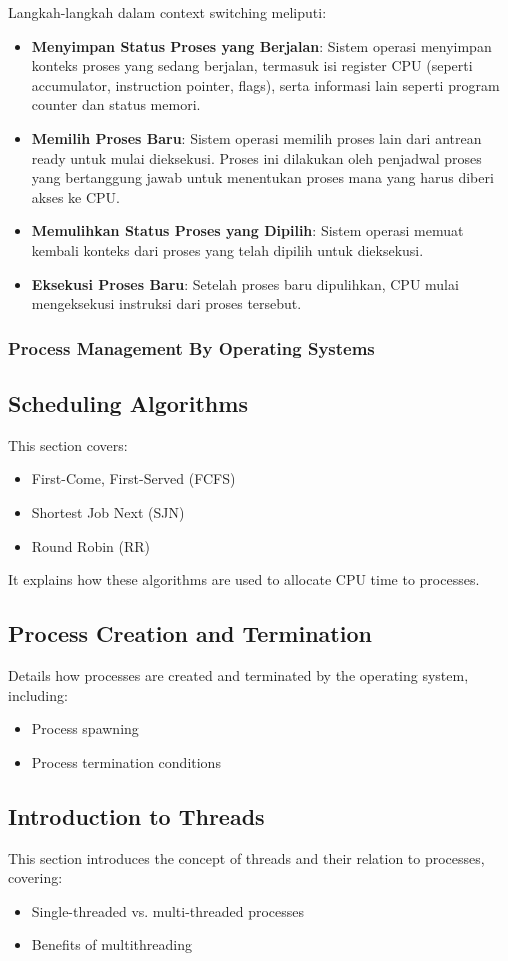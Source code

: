 \documentclass[12pt]{article}
\begin{document}
Langkah-langkah dalam context switching meliputi:
\begin{itemize}
\item \textbf{Menyimpan Status Proses yang Berjalan}:
Sistem operasi menyimpan konteks proses yang sedang berjalan, termasuk isi register CPU (seperti accumulator, instruction pointer, flags), serta informasi lain seperti program counter dan status memori.
\item \textbf{Memilih Proses Baru}:
Sistem operasi memilih proses lain dari antrean ready untuk mulai dieksekusi. Proses ini dilakukan oleh penjadwal proses yang bertanggung jawab untuk menentukan proses mana yang harus diberi akses ke CPU.
\item \textbf{Memulihkan Status Proses yang Dipilih}:
Sistem operasi memuat kembali konteks dari proses yang telah dipilih untuk dieksekusi.
\item \textbf{Eksekusi Proses Baru}:
Setelah proses baru dipulihkan, CPU mulai mengeksekusi instruksi dari proses tersebut.
\end{itemize}

\subsubsection{Process Management By Operating Systems}
\subsection{Scheduling Algorithms}
This section covers:
\begin{itemize}
    \item First-Come, First-Served (FCFS)
    \item Shortest Job Next (SJN)
    \item Round Robin (RR)
\end{itemize}
It explains how these algorithms are used to allocate CPU time to processes.

\subsection{Process Creation and Termination}
Details how processes are created and terminated by the operating system, including:
\begin{itemize}
    \item Process spawning
    \item Process termination conditions
\end{itemize}

\subsection{Introduction to Threads}
This section introduces the concept of threads and their relation to processes, covering:
\begin{itemize}
    \item Single-threaded vs. multi-threaded processes
    \item Benefits of multithreading
\end{itemize}
\end{document}
